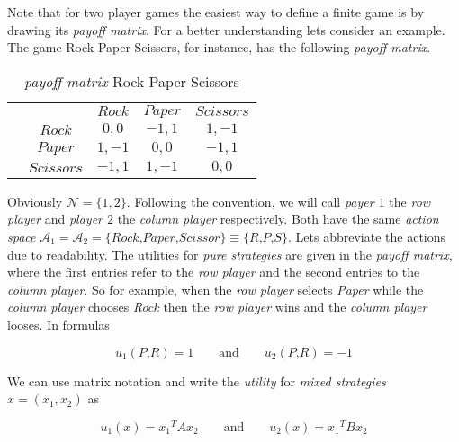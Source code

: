 Note that for two player games the easiest way to define a finite game is by drawing its \textit{payoff matrix}. For a better understanding lets consider an example. The game Rock Paper Scissors, for instance, has the following \textit{payoff matrix}.\\

\begin{table}[H]\centering
\setlength{\extrarowheight}{2pt}
\begin{tabular}{cc|c|c|c|}
  & \multicolumn{1}{c}{} & \multicolumn{1}{c}{$Rock$}  & \multicolumn{1}{c}{$Paper$}  & \multicolumn{1}{c}{$Scissors$} \\\cline{3-5}
            & $Rock$ & $0,0$ & $-1,1$ & $1,-1$ \\ \cline{3-5}
            & $Paper$ & $1,-1$ & $0,0$ & $-1,1$ \\\cline{3-5}
            & $Scissors$ & $-1,1$ & $1,-1$ & $0,0$ \\\cline{3-5}
\end{tabular}\caption{\label{tab:payoffRPSFromDefinition}\textit{payoff matrix} Rock Paper Scissors}
\end{table}

Obviously $\mathcal{N} = \{1,2\}$. Following the convention, we will call \textit{payer $1$} the \textit{row player} and \textit{player $2$} the \textit{column player} respectively. Both have the same \textit{action space} $\mathcal{A}_1 = \mathcal{A}_2 = \{\textit{Rock,Paper,Scissor}\} \equiv \{\textit{R,P,S\}}$. Lets abbreviate the actions due to readability. The utilities for \textit{pure strategies} are given in the \textit{payoff matrix}, where the first entries refer to the \textit{row player} and the second entries to the \textit{column player}. So for example, when the \textit{row player} selects \textit{Paper} while the \textit{column player} chooses \textit{Rock} then the \textit{row player} wins and the \textit{column player} looses. In formulas

\begin{equation*}
    u_1(\textit{P,R}) = 1 \qquad \text{and} \qquad u_2(\textit{P,R}) = -1
\end{equation*}

We can use matrix notation and write the \textit{utility} for \textit{mixed strategies} $x = (x_1,x_2)$ as

\begin{equation*}
    u_1(x) = x{_1}^{T}Ax_2 \qquad \text{and} \qquad u_2(x) = x{_1}^{T}Bx_2
\end{equation*}


